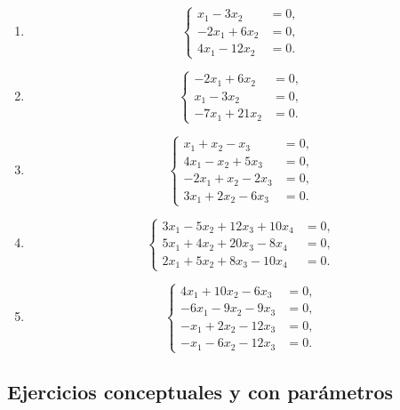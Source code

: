 \documentclass[12pt]{article}
\theoremstyle{remark}
\newcommand{\sistema}[1]{%
\[
\left\{
\begin{aligned}
#1
\end{aligned}
\right.
\]
}
\begin{document}
\begin{enumerate}[label=\textbf{H\arabic*.},leftmargin=*]
\item \sistema{x_1-3x_2&=0,\\-2x_1+6x_2&=0,\\4x_1-12x_2&=0.}
\item \sistema{-2x_1+6x_2&=0,\\x_1-3x_2&=0,\\-7x_1+21x_2&=0.}
\item \sistema{x_1+x_2-x_3&=0,\\4x_1-x_2+5x_3&=0,\\-2x_1+x_2-2x_3&=0,\\3x_1+2x_2-6x_3&=0.}
\item \sistema{3x_1-5x_2+12x_3+10x_4&=0,\\5x_1+4x_2+20x_3-8x_4&=0,\\2x_1+5x_2+8x_3-10x_4&=0.}
\item \sistema{4x_1+10x_2-6x_3&=0,\\-6x_1-9x_2-9x_3&=0,\\-x_1+2x_2-12x_3&=0,\\-x_1-6x_2-12x_3&=0.}
\end{enumerate}

\subsection*{Ejercicios conceptuales y con parámetros}
\end{document}
